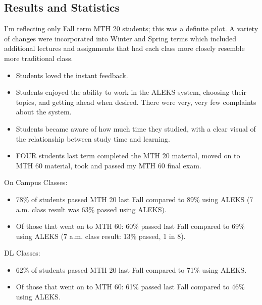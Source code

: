 \subsection{Results and Statistics}
I'm reflecting only Fall term MTH 20 students; this was a definite pilot.  
A variety of changes were incorporated into Winter and Spring terms 
which included additional lectures and assignments that had each class 
more closely resemble more traditional class.
\begin{itemize}
	\item Students loved the instant feedback.
    \item Students enjoyed the ability to work in the ALEKS system, choosing
      their topics, and getting ahead when desired.  There were very, very few
      complaints about the system.
    \item Students became aware of how much time they studied, with a clear
      visual of the relationship between study time and learning. 
    \item FOUR students last term completed the MTH 20 material, moved on to
      MTH 60 material, took and passed my MTH 60 final exam.
\end{itemize}

On Campus Classes:  
\begin{itemize}
    \item 78\% of students passed MTH 20 last Fall compared to 89\% using
      ALEKS  (7 {\sc a.m.}  class result was 63\% passed using ALEKS).
    \item Of those that went on to MTH 60:  60\% passed last Fall compared to
      69\% using ALEKS (7 {\sc a.m.} class result: 13\% passed, 1 in 8).
\end{itemize}
DL Classes:
\begin{itemize}
    \item 62\% of students passed MTH 20 last Fall compared to 71\% using
      ALEKS.
    \item Of those that went on to MTH 60:  61\% passed last Fall compared to
      46\% using ALEKS.  
\end{itemize}

